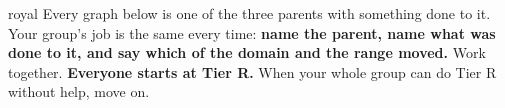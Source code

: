 \documentclass[10pt]{article}
\begin{document}

\vspace{0.15in}

\begin{scenariobox}{royal}
\small
Every graph below is one of the three parents with something done to it. Your group's job is the
same every time: \textbf{name the parent, name what was done to it, and say which of the domain and
the range moved.} Work together. \textbf{Everyone starts at Tier R.} When your whole group can do
Tier R without help, move on.
\end{scenariobox}

\vspace{0.10in}
\end{document}

